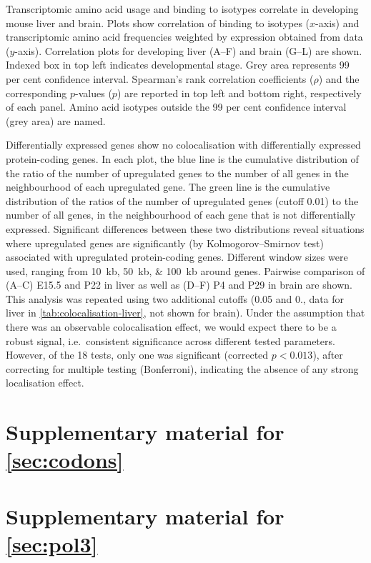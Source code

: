 \thispagestyle{empty}
    {Transcriptomic \mrna amino acid usage and  binding to \trna isotypes
    correlate in developing mouse liver and brain.}
    {Plots show correlation of  binding to \trna isotypes (\(x\)-axis) and
    transcriptomic amino acid frequencies weighted by expression obtained from
    \rnaseq data (\(y\)-axis). Correlation plots for developing liver (A–F) and
    brain (G–L) are shown. Indexed box in top left indicates developmental
    stage. Grey area represents \num{99} per cent confidence interval.
    Spearman’s rank correlation coefficients (\(\rho\)) and the corresponding
    \(p\)-values (\(p\)) are reported in top left and bottom right, respectively
    of each panel. Amino acid isotypes outside the \num{99} per cent confidence
    interval (grey area) are named.}



    {Differentially expressed \trna genes show no colocalisation with
    differentially expressed protein-coding genes.}
    {In each plot, the blue line is the cumulative distribution of the ratio of
    the number of upregulated \mrna genes to the number of all \mrna genes in
    the neighbourhood of each upregulated \trna gene. The green line is the
    cumulative distribution of the ratios of the number of upregulated \mrna
    genes (\fdr cutoff \num{0.01}) to the number of all \mrna genes, in the
    neighbourhood of each \trna gene that is not differentially expressed.
    Significant differences between these two distributions reveal situations
    where upregulated \trna genes are significantly (by Kolmogorov–Smirnov test)
    associated with upregulated protein-coding genes. Different window sizes
    were used, ranging from \SIlist{10;50;100}{kb} around \trna genes. Pairwise
    comparison of (A–C) E15.5 and P22 in liver as well as (D–F) P4 and P29 in
    brain are shown. This analysis was repeated using two additional \fdr
    cutoffs (\num{0.05} and \num{0.}, data for liver in
    \cref{tab:colocalisation-liver}, not shown for brain). Under the assumption
    that there was an observable colocalisation effect, we would expect there to
    be a robust signal, i.e.\ consistent significance across different tested
    parameters. However, of the \num{18} tests, only one was significant
    (corrected \(p<0.013\)), after correcting for multiple testing (Bonferroni),
    indicating the absence of any strong localisation effect.}

\chapter{Supplementary material for \texorpdfstring{\cref*{sec:codons}}{chapter 3}}

\chapter{Supplementary material for \texorpdfstring{\cref*{sec:pol3}}{chapter 4}}

\endgroup
